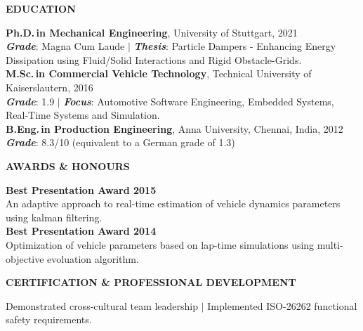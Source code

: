 \documentclass[a4paper,10pt]{article}
\begin{document}
\newpage

\noindent{\rule{\linewidth}{1.4pt}}
\noindent \textbf{EDUCATION}

\vspace{-0.1cm}
\noindent{\rule{\linewidth}{0.01cm}}

\noindent \textbf{Ph.D.\,in Mechanical Engineering}, University of Stuttgart, 2021\\
\noindent \textcolor{highlightcolor}{\textbf{\textit{Grade}}}: Magna Cum Laude $\vert$ \textcolor{highlightcolor}{\textbf{\textit{Thesis}}}: {Particle Dampers - Enhancing Energy Dissipation using Fluid/Solid Interactions and Rigid Obstacle-Grids.}\\

\noindent \textbf{M.Sc.\,in Commercial Vehicle Technology}, Technical University of Kaiserslautern, 2016\\
\noindent \textcolor{highlightcolor}{\textbf{\textit{Grade}}}: 1.9 $\vert$ \textcolor{highlightcolor}{\textbf{\textit{Focus}}}:  Automotive Software Engineering, Embedded Systems, Real-Time Systems and Simulation.\\

\noindent \textbf{B.Eng.\,in Production Engineering}, Anna University, Chennai, India, 2012\\
\noindent \textcolor{highlightcolor}{\textbf{\textit{Grade}}}: 8.3/10 (equivalent to a German grade of 1.3)

\noindent{\rule{\linewidth}{1.4pt}}
\textbf{AWARDS \& HONOURS}

\vspace{-0.1cm}
\noindent{\rule{\linewidth}{0.01cm}}

\vspace{0.1cm}
\noindent \textbf{Best Presentation Award 2015}\\
An adaptive approach to real-time estimation of vehicle dynamics parameters using kalman filtering.\\

\noindent \textbf{Best Presentation Award 2014}\\
Optimization of vehicle parameters based on lap-time simulations using multi-objective evoluation algorithm.

\noindent{\rule{\linewidth}{1.4pt}}
\textbf{CERTIFICATION \& PROFESSIONAL DEVELOPMENT}

\vspace{-0.1cm}
\noindent{\rule{\linewidth}{0.01cm}}

\noindent Demonstrated cross-cultural team leadership $\vert$ Implemented ISO-26262 functional safety requirements.
\end{document}
